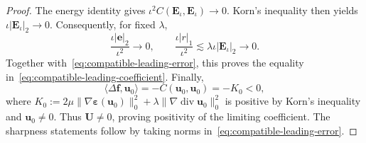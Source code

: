 \documentclass[10pt]{amsart}
\renewcommand{\div}{\operatorname{div}}
\numberwithin{equation}{section}
\begin{document}
\begin{proof}
The energy identity gives $\iota^2C(\boldsymbol E_\iota,\boldsymbol E_\iota)\to0$. Korn's inequality then yields $\iota|\boldsymbol E_\iota|_2\to0$. Consequently, for fixed $\lambda$,
\[
\frac{\iota|\boldsymbol e|_2}{\iota^2}\longrightarrow0,
\qquad
\frac{\iota|r|_1}{\iota^2}\lesssim\lambda\iota|\boldsymbol E_\iota|_2\longrightarrow0.
\]
Together with~\eqref{eq:compatible-leading-error}, this proves the equality in~\eqref{eq:compatible-leading-coefficient}. Finally,
\[
\langle\Delta\boldsymbol f,\boldsymbol u_0\rangle
=-C(\boldsymbol u_0,\boldsymbol u_0)=-K_0<0,
\]
where $K_0:=2\mu\|\nabla\boldsymbol\varepsilon(\boldsymbol u_0)\|_0^2+\lambda\|\nabla\div\boldsymbol u_0\|_0^2$ is positive by Korn's inequality and $\boldsymbol u_0\neq0$. Thus $\boldsymbol U\neq0$, proving positivity of the limiting coefficient. The sharpness statements follow by taking norms in~\eqref{eq:compatible-leading-error}.
\end{proof}





\end{document}
